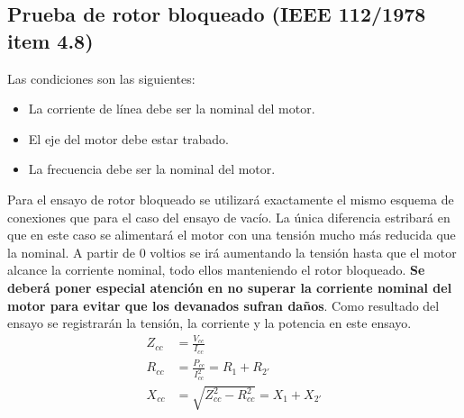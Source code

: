 \documentclass[a4paper,12pt]{article}
\begin{document}
\subsection[Prueba de rotor bloqueado IEEE 112/1978]{Prueba de rotor bloqueado (IEEE 112/1978 item 4.8)}
Las condiciones son las siguientes:
\begin{itemize}
    \item La corriente de línea debe ser la nominal del motor.
    \item El eje del motor debe estar trabado.
    \item La frecuencia debe ser la nominal del motor.
\end{itemize}
Para el ensayo de rotor bloqueado se utilizará exactamente el mismo esquema de conexiones que para el caso del ensayo de vacío. La única diferencia estribará en que en este caso se alimentará el motor con una tensión mucho más reducida que la nominal. A partir de 0 voltios se irá aumentando la tensión hasta que el motor alcance la corriente nominal, todo ellos manteniendo el rotor bloqueado. \textbf{Se deberá poner especial atención en no superar la corriente nominal del motor para evitar que los devanados sufran daños}. Como resultado del ensayo se registrarán la tensión, la corriente y la potencia en este ensayo.
\begin{align}
    Z_{cc} &= \frac{V_{cc}}{I_{cc}}\\[4pt]
    R_{cc} &= \frac{P_{cc}}{I^{2}_{cc}} = R_{1} + R_{2'}\\[4pt]
    X_{cc} &= \sqrt{Z^{2}_{cc} - R^{2}_{cc}} = X_{1} + X_{2'}
\end{align}
\begin{table}[H]
\centering
{}
\end{table}
\end{document}
